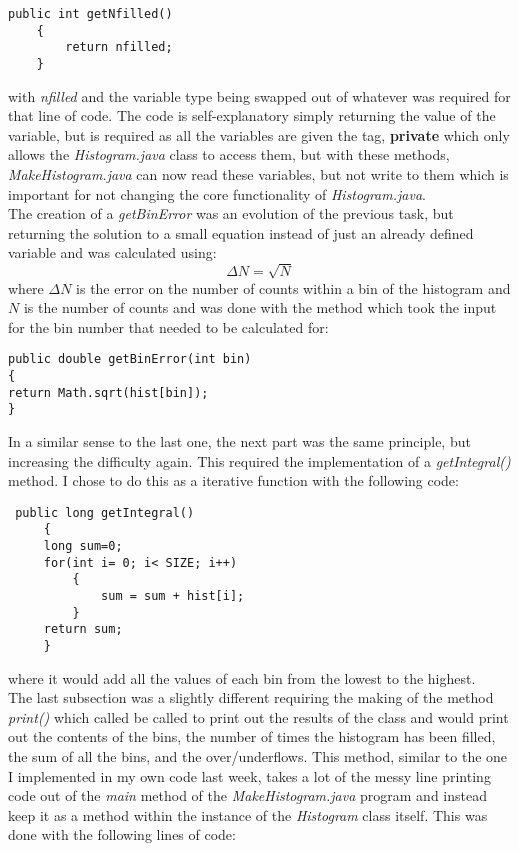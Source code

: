\documentclass{article}
\begin{document}
\begin{multicols}{2}
	\begin{lstlisting}
public int getNfilled()          
	{
		return nfilled;
	}
	\end{lstlisting}
	with \textit{nfilled} and the variable type being swapped out of whatever was required for that line of code. The code is self-explanatory simply returning the value of the variable, but is required as all the variables are given the tag, \textbf{private} which only allows the \textit{Histogram.java} class to access them, but with these methods, \textit{MakeHistogram.java} can now read these variables, but not write to them which is important for not changing the core functionality of \textit{Histogram.java}.  \\ \indent The creation of a \textit{getBinError} was an evolution of the previous task, but returning the solution to a small equation instead of just an already defined variable and was calculated using: 
	\begin{equation}
	\Delta N = \sqrt{N}
	\end{equation}
	where $\Delta N$ is the error on the number of counts within a bin of the histogram and $N$ is the number of counts and was done with the method which took the input for the bin number that needed to be calculated for:
	\begin{lstlisting}
public double getBinError(int bin) 
{
return Math.sqrt(hist[bin]);
}
	\end{lstlisting}
	In a similar sense to the last one, the next part was the same principle, but increasing the difficulty again. This required the implementation of a \textit{getIntegral()} method. I chose to do this as a iterative function with the following code:
	\begin{lstlisting}
 public long getIntegral() 
	 {
	 long sum=0;
	 for(int i= 0; i< SIZE; i++)
		 {
			 sum = sum + hist[i];
		 }
	 return sum;
	 }
	\end{lstlisting}
	where it would add all the values of each bin from the lowest to the highest. \\ \indent The last subsection was a slightly different requiring the making of the method \textit{print()} which called be called to print out the results of the class and would print out the contents of the bins, the number of times the histogram has been filled, the sum of all the bins, and the over/underflows. This method, similar to the one I implemented in my own code last week, takes a lot of the messy line printing code out of the \textit{main} method of the \textit{MakeHistogram.java} program and instead keep it as a method within the instance of the \textit{Histogram} class itself. This was done with the following lines of code:

\end{multicols}
\end{document}
